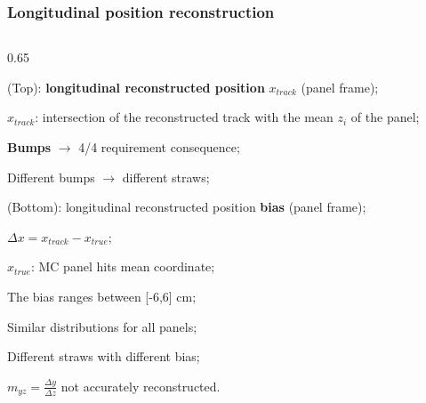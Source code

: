 \documentclass{beamer}
\begin{document}
\begin{frame}
    \frametitle{Longitudinal position reconstruction}

    \begin{columns}
\begin{column}{0.65\framewidth}
\vspace{-6mm}
   \setlength{\leftmargini}{1.2em}
      \begin{itemize}
 {\small
 \item (Top): \textbf{longitudinal reconstructed position} $x_{track}$ (panel frame);
  \vspace{1.2mm}
 \item $x_{track}$: intersection of the reconstructed track with the mean $z_i$ of the panel;
   \vspace{1.2mm}
 \item  \textbf{Bumps} $\rightarrow$ 4/4 requirement consequence;
   \vspace{1.2mm}
\item Different bumps $\rightarrow$ different straws;
  \vspace{1.2mm}
\item (Bottom): longitudinal reconstructed position \textbf{bias} (panel frame);
  \vspace{1.2mm}
 \item $\Delta x = x_{track}-x_{true}$;
   \vspace{1.2mm}
 \item $x_{true}$: MC panel hits mean coordinate;
   \vspace{1.2mm}
\item The bias ranges between [-6,6] cm;
  \vspace{1.2mm}
\item Similar distributions for all panels;
  \vspace{1.2mm}
\item Different straws with different bias; 
  \vspace{1.2mm}
\item $m_{yz}=\frac{\Delta y}{\Delta z}$ not accurately reconstructed.}


\end{itemize}
\end{column}
\end{columns}
\end{frame}
\end{document}
